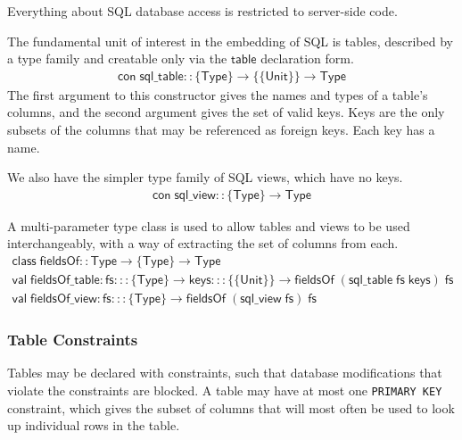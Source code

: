 \documentclass{article}
\newcommand{\mt}[1]{\mathsf{#1}}
\begin{document}
Everything about SQL database access is restricted to server-side code.

The fundamental unit of interest in the embedding of SQL is tables, described by a type family and creatable only via the $\mt{table}$ declaration form.
$$\begin{array}{l}
  \mt{con} \; \mt{sql\_table} :: \{\mt{Type}\} \to \{\{\mt{Unit}\}\} \to \mt{Type}
\end{array}$$
The first argument to this constructor gives the names and types of a table's columns, and the second argument gives the set of valid keys.  Keys are the only subsets of the columns that may be referenced as foreign keys.  Each key has a name.

We also have the simpler type family of SQL views, which have no keys.
$$\begin{array}{l}
  \mt{con} \; \mt{sql\_view} :: \{\mt{Type}\} \to \mt{Type}
\end{array}$$

A multi-parameter type class is used to allow tables and views to be used interchangeably, with a way of extracting the set of columns from each.
$$\begin{array}{l}
  \mt{class} \; \mt{fieldsOf} :: \mt{Type} \to \{\mt{Type}\} \to \mt{Type} \\
  \mt{val} \; \mt{fieldsOf\_table} : \mt{fs} ::: \{\mt{Type}\} \to \mt{keys} ::: \{\{\mt{Unit}\}\} \to \mt{fieldsOf} \; (\mt{sql\_table} \; \mt{fs} \; \mt{keys}) \; \mt{fs} \\
  \mt{val} \; \mt{fieldsOf\_view} : \mt{fs} ::: \{\mt{Type}\} \to \mt{fieldsOf} \; (\mt{sql\_view} \; \mt{fs}) \; \mt{fs}
\end{array}$$

\subsubsection{Table Constraints}

Tables may be declared with constraints, such that database modifications that violate the constraints are blocked.  A table may have at most one \texttt{PRIMARY KEY} constraint, which gives the subset of columns that will most often be used to look up individual rows in the table.
\end{document}
